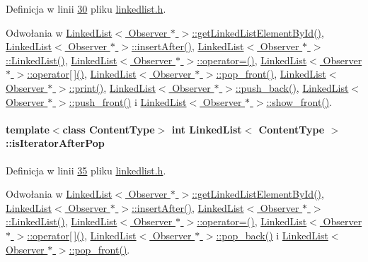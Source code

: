 Definicja w linii \hyperlink{linkedlist_8h_source_l00030}{30} pliku \hyperlink{linkedlist_8h_source}{linkedlist.\-h}.



Odwołania w \hyperlink{linkedlist_8h_source_l00197}{Linked\-List$<$ Observer $\ast$ $>$\-::get\-Linked\-List\-Element\-By\-Id()}, \hyperlink{linkedlist_8h_source_l00238}{Linked\-List$<$ Observer $\ast$ $>$\-::insert\-After()}, \hyperlink{linkedlist_8h_source_l00038}{Linked\-List$<$ Observer $\ast$ $>$\-::\-Linked\-List()}, \hyperlink{linkedlist_8h_source_l00262}{Linked\-List$<$ Observer $\ast$ $>$\-::operator=()}, \hyperlink{linkedlist_8h_source_l00159}{Linked\-List$<$ Observer $\ast$ $>$\-::operator\mbox{[}$\,$\mbox{]}()}, \hyperlink{linkedlist_8h_source_l00087}{Linked\-List$<$ Observer $\ast$ $>$\-::pop\-\_\-front()}, \hyperlink{linkedlist_8h_source_l00144}{Linked\-List$<$ Observer $\ast$ $>$\-::print()}, \hyperlink{linkedlist_8h_source_l00100}{Linked\-List$<$ Observer $\ast$ $>$\-::push\-\_\-back()}, \hyperlink{linkedlist_8h_source_l00113}{Linked\-List$<$ Observer $\ast$ $>$\-::push\-\_\-front()} i \hyperlink{linkedlist_8h_source_l00127}{Linked\-List$<$ Observer $\ast$ $>$\-::show\-\_\-front()}.

\hypertarget{class_linked_list_a8d354ba516e8270027bf617b121b49fe}{
\paragraph[{is\-Iterator\-After\-Pop}]{\setlength{\rightskip}{0pt plus 5cm}template$<$class Content\-Type$>$ int {\bf Linked\-List}$<$ Content\-Type $>$\-::is\-Iterator\-After\-Pop}}\label{class_linked_list_a8d354ba516e8270027bf617b121b49fe}


Definicja w linii \hyperlink{linkedlist_8h_source_l00035}{35} pliku \hyperlink{linkedlist_8h_source}{linkedlist.\-h}.



Odwołania w \hyperlink{linkedlist_8h_source_l00197}{Linked\-List$<$ Observer $\ast$ $>$\-::get\-Linked\-List\-Element\-By\-Id()}, \hyperlink{linkedlist_8h_source_l00238}{Linked\-List$<$ Observer $\ast$ $>$\-::insert\-After()}, \hyperlink{linkedlist_8h_source_l00038}{Linked\-List$<$ Observer $\ast$ $>$\-::\-Linked\-List()}, \hyperlink{linkedlist_8h_source_l00262}{Linked\-List$<$ Observer $\ast$ $>$\-::operator=()}, \hyperlink{linkedlist_8h_source_l00159}{Linked\-List$<$ Observer $\ast$ $>$\-::operator\mbox{[}$\,$\mbox{]}()}, \hyperlink{linkedlist_8h_source_l00073}{Linked\-List$<$ Observer $\ast$ $>$\-::pop\-\_\-back()} i \hyperlink{linkedlist_8h_source_l00087}{Linked\-List$<$ Observer $\ast$ $>$\-::pop\-\_\-front()}.

